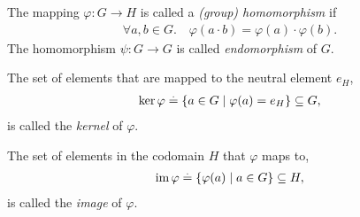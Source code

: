 \begin{defn}
\leavevmode\begin{defnlist}
    \item The mapping $\varphi : G \to H$ is called a \emph{(group) homomorphism} if \begin{align}
        \forall a, b \in G.\quad \varphi(a \cdot b) = \varphi(a) \cdot \varphi(b). \label{eq:homomorphism}
    \end{align} The homomorphism $\psi : G \to G$ is called \emph{endomorphism} of $G$.
    \item The set of elements that are mapped to the neutral element $e_H$, \begin{align}
        \ker{\varphi} \overset{.}{=} \{a \in G \mid \varphi(a) = e_H\} \subseteq G,
    \end{align} is called the \emph{kernel} of $\varphi$.
    \item The set of elements in the codomain $H$ that $\varphi$ maps to, \begin{align}
        \operatorname*{im}{\varphi} \overset{.}{=} \{\varphi(a) \mid a \in G\} \subseteq H,
    \end{align} is called the \emph{image} of $\varphi$.
\end{defnlist}
\end{defn}


